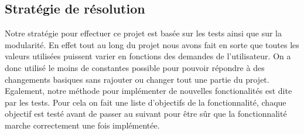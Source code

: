     \subsection{Stratégie de résolution}
        Notre stratégie pour effectuer ce projet est basée sur les tests ainsi que sur la modularité.
        En effet tout au long du projet nous avons fait  en sorte que toutes les valeurs utilisées puissent varier en fonctions des demandes de l'utilisateur. On a donc utilisé le moins de constantes possible pour pouvoir répondre à des changements basiques sans rajouter ou changer tout une partie du projet. \\
        Egalement, notre méthode pour implémenter de nouvelles fonctionalités est dite par les tests. Pour cela on fait une liste d'objectifs de la fonctionnalité, chaque objectif est testé avant de passer au suivant pour être sûr que la fonctionnalité marche correctement une fois implémentée.